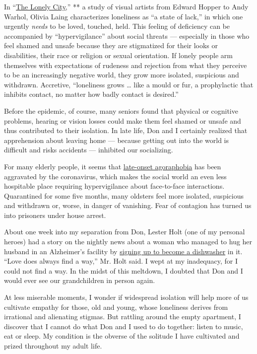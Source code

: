 In
``\href{https://www.nytimes.com/2016/03/20/books/review/the-lonely-city-by-olivia-laing.html}{The
Lonely City,}'' ** a study of visual artists from Edward Hopper to Andy
Warhol, Olivia Laing characterizes loneliness as ``a state of lack,'' in
which one urgently \emph{needs} to be loved, touched, held. This feeling
of deficiency can be accompanied by ``hypervigilance'' about social
threats --- especially in those who feel shamed and unsafe because they
are stigmatized for their looks or disabilities, their race or religion
or sexual orientation. If lonely people arm themselves with expectations
of rudeness and rejection from what they perceive to be an increasingly
negative world, they grow more isolated, suspicious and withdrawn.
Accretive, ``loneliness grows \ldots{} like a mould or fur, a
prophylactic that inhibits contact, no matter how badly contact is
desired.''

Before the epidemic, of course, many seniors found that physical or
cognitive problems, hearing or vision losses could make them feel shamed
or unsafe and thus contributed to their isolation. In late life, Don and
I certainly realized that apprehension about leaving home --- because
getting out into the world is difficult and risks accidents ---
inhibited our socializing.

For many elderly people, it seems that
\href{https://ajp.psychiatryonline.org/doi/10.1176/appi.ajp.2013.12091235}{late-onset
agoraphobia} has been aggravated by the coronavirus, which makes the
social world an even less hospitable place requiring hypervigilance
about face-to-face interactions. Quarantined for some five months, many
oldsters feel more isolated, suspicious and withdrawn or, worse, in
danger of vanishing. Fear of contagion has turned us into prisoners
under house arrest.

About one week into my separation from Don, Lester Holt (one of my
personal heroes) had a story on the nightly news about a woman who
managed to hug her husband in an Alzheimer's facility by
\href{https://www.facebook.com/watch/?v=669777473751880}{signing up to
become a dishwasher} in it. ``Love does always find a way,'' Mr. Holt
said. I wept at my inadequacy, for I could not find a way. In the midst
of this meltdown, I doubted that Don and I would ever see our
grandchildren in person again.

At less miserable moments, I wonder if widespread isolation will help
more of us cultivate empathy for those, old and young, whose loneliness
derives from irrational and alienating stigmas. But rattling around the
empty apartment, I discover that I cannot do what Don and I used to do
together: listen to music, eat or sleep. My condition is the obverse of
the solitude I have cultivated and prized throughout my adult life.

